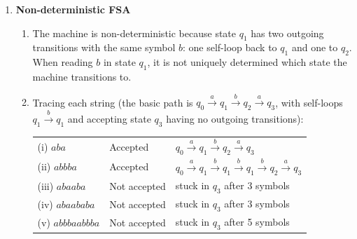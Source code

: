 \documentclass[11pt]{article}
\begin{document}
\begin{enumerate}
\begin{enumerate}
$\Sigma = \{0\text{--}9, a\text{--}z, A\text{--}Z, \text{space}, \text{punctuation}, \ldots\}$

Mathematical: $[0\text{-}9]^+ \Sigma^* [a\text{-}zA\text{-}Z]^+$

Perl/Python:
\begin{verbatim}
/^\d+.*[a-zA-Z]+$/
\end{verbatim}

\item All strings that have both the word \emph{flower} and the word \emph{bee} in them as whole words.

$\Sigma = \{a\text{--}z, A\text{--}Z, \text{space}, \text{punctuation}, \ldots\}$

Both orderings (flower before bee, or bee before flower) must be covered.

Mathematical: $\Sigma^* \text{\textbackslash b} flower \text{\textbackslash b} \Sigma^* \text{\textbackslash b} bee \text{\textbackslash b} \Sigma^* \mid \Sigma^* \text{\textbackslash b} bee \text{\textbackslash b} \Sigma^* \text{\textbackslash b} flower \text{\textbackslash b} \Sigma^*$

Perl/Python:
\begin{verbatim}
/^.*\bflower\b.*\bbee\b.*$|^.*\bbee\b.*\bflower\b.*$/
\end{verbatim}

\end{enumerate}

\item \textbf{Non-deterministic FSA}

\begin{enumerate}

\item The machine is non-deterministic because state $q_1$ has two outgoing transitions with the same symbol $b$: one self-loop back to $q_1$ and one to $q_2$. When reading $b$ in state $q_1$, it is not uniquely determined which state the machine transitions to.

\item Tracing each string (the basic path is $q_0 \xrightarrow{a} q_1 \xrightarrow{b} q_2 \xrightarrow{a} q_3$, with self-loops $q_1 \xrightarrow{b} q_1$ and accepting state $q_3$ having no outgoing transitions):

\begin{tabular}{lll}
(i) $aba$ & Accepted & $q_0 \xrightarrow{a} q_1 \xrightarrow{b} q_2 \xrightarrow{a} q_3$ \\
(ii) $abbba$ & Accepted & $q_0 \xrightarrow{a} q_1 \xrightarrow{b} q_1 \xrightarrow{b} q_1 \xrightarrow{b} q_2 \xrightarrow{a} q_3$ \\
(iii) $abaaba$ & Not accepted & stuck in $q_3$ after 3 symbols \\
(iv) $abaababa$ & Not accepted & stuck in $q_3$ after 3 symbols \\
(v) $abbbaabbba$ & Not accepted & stuck in $q_3$ after 5 symbols \\
\end{tabular}


\end{enumerate}
\end{enumerate}
\end{document}
